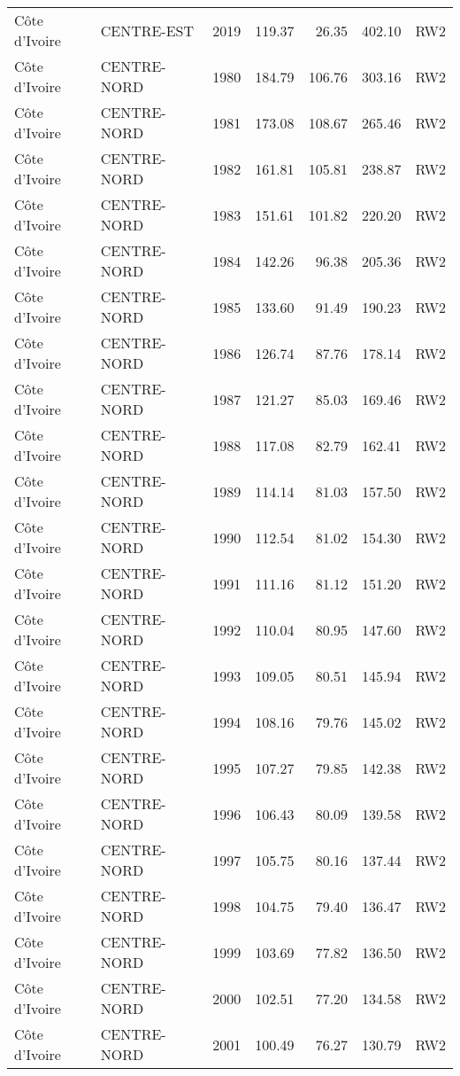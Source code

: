 \begin{longtable}{lllrrrl}
  C\^{o}te d'Ivoire & CENTRE-EST & 2019 & 119.37 & 26.35 & 402.10 & RW2 \\ 
  C\^{o}te d'Ivoire & CENTRE-NORD & 1980 & 184.79 & 106.76 & 303.16 & RW2 \\ 
  C\^{o}te d'Ivoire & CENTRE-NORD & 1981 & 173.08 & 108.67 & 265.46 & RW2 \\ 
  C\^{o}te d'Ivoire & CENTRE-NORD & 1982 & 161.81 & 105.81 & 238.87 & RW2 \\ 
  C\^{o}te d'Ivoire & CENTRE-NORD & 1983 & 151.61 & 101.82 & 220.20 & RW2 \\ 
  C\^{o}te d'Ivoire & CENTRE-NORD & 1984 & 142.26 & 96.38 & 205.36 & RW2 \\ 
  C\^{o}te d'Ivoire & CENTRE-NORD & 1985 & 133.60 & 91.49 & 190.23 & RW2 \\ 
  C\^{o}te d'Ivoire & CENTRE-NORD & 1986 & 126.74 & 87.76 & 178.14 & RW2 \\ 
  C\^{o}te d'Ivoire & CENTRE-NORD & 1987 & 121.27 & 85.03 & 169.46 & RW2 \\ 
  C\^{o}te d'Ivoire & CENTRE-NORD & 1988 & 117.08 & 82.79 & 162.41 & RW2 \\ 
  C\^{o}te d'Ivoire & CENTRE-NORD & 1989 & 114.14 & 81.03 & 157.50 & RW2 \\ 
  C\^{o}te d'Ivoire & CENTRE-NORD & 1990 & 112.54 & 81.02 & 154.30 & RW2 \\ 
  C\^{o}te d'Ivoire & CENTRE-NORD & 1991 & 111.16 & 81.12 & 151.20 & RW2 \\ 
  C\^{o}te d'Ivoire & CENTRE-NORD & 1992 & 110.04 & 80.95 & 147.60 & RW2 \\ 
  C\^{o}te d'Ivoire & CENTRE-NORD & 1993 & 109.05 & 80.51 & 145.94 & RW2 \\ 
  C\^{o}te d'Ivoire & CENTRE-NORD & 1994 & 108.16 & 79.76 & 145.02 & RW2 \\ 
  C\^{o}te d'Ivoire & CENTRE-NORD & 1995 & 107.27 & 79.85 & 142.38 & RW2 \\ 
  C\^{o}te d'Ivoire & CENTRE-NORD & 1996 & 106.43 & 80.09 & 139.58 & RW2 \\ 
  C\^{o}te d'Ivoire & CENTRE-NORD & 1997 & 105.75 & 80.16 & 137.44 & RW2 \\ 
  C\^{o}te d'Ivoire & CENTRE-NORD & 1998 & 104.75 & 79.40 & 136.47 & RW2 \\ 
  C\^{o}te d'Ivoire & CENTRE-NORD & 1999 & 103.69 & 77.82 & 136.50 & RW2 \\ 
  C\^{o}te d'Ivoire & CENTRE-NORD & 2000 & 102.51 & 77.20 & 134.58 & RW2 \\ 
  C\^{o}te d'Ivoire & CENTRE-NORD & 2001 & 100.49 & 76.27 & 130.79 & RW2 \\ 

\end{longtable}
